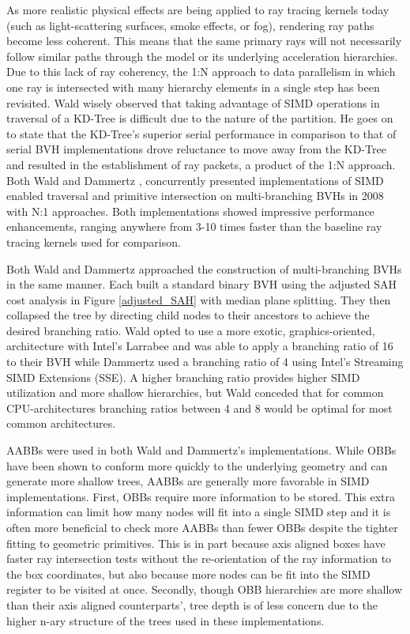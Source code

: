 As more realistic physical effects are being applied to ray tracing kernels
today (such as light-scattering surfaces, smoke effects, or fog), rendering ray
paths become less coherent. This means that the same primary rays will not
necessarily follow similar paths through the model or its underlying
acceleration hierarchies. Due to this lack of ray coherency, the 1:N approach to
data parallelism in which one ray is intersected with many hierarchy elements in
a single step has been revisited. Wald wisely observed that taking advantage of
SIMD operations in traversal of a KD-Tree is difficult due to the nature of the
partition. He goes on to state that the KD-Tree's superior serial performance in
comparison to that of serial BVH implementations drove reluctance to move away
from the KD-Tree and resulted in the establishment of ray packets, a product of
the 1:N approach. \cite{Wald_2008} Both Wald and Dammertz \cite{Dammertz_2008},
concurrently presented implementations of SIMD enabled traversal and primitive
intersection on multi-branching BVHs in 2008 with N:1 approaches. Both
implementations showed impressive performance enhancements, ranging anywhere
from 3-10 times faster than the baseline ray tracing kernels used for
comparison.

Both Wald and Dammertz approached the construction of multi-branching BVHs in
the same manner. Each built a standard binary BVH using the adjusted SAH cost
analysis in Figure \ref{adjusted_SAH} with median plane splitting. They then
collapsed the tree by directing child nodes to their ancestors to achieve the
desired branching ratio. Wald opted to use a more exotic, graphics-oriented,
architecture with Intel's Larrabee and was able to apply a branching ratio of 16
to their BVH while Dammertz used a branching ratio of 4 using Intel's Streaming
SIMD Extensions (SSE). A higher branching ratio provides higher SIMD utilization
and more shallow hierarchies, but Wald conceded that for common CPU-architectures
branching ratios between 4 and 8 would be optimal for most common architectures.

AABBs were used in both Wald and Dammertz's implementations. While OBBs have
been shown to conform more quickly to the underlying geometry and can generate
more shallow trees, AABBs are generally more favorable in SIMD
implementations. First, OBBs require more information to be stored. This extra
information can limit how many nodes will fit into a single SIMD step and it is
often more beneficial to check more AABBs than fewer OBBs despite the tighter
fitting to geometric primitives. This is in part because axis aligned boxes have
faster ray intersection tests without the re-orientation of the ray information
to the box coordinates, but also because more nodes can be fit into the SIMD
register to be visited at once. Secondly, though OBB hierarchies are more
shallow than their axis aligned counterparts', tree depth is of less concern due
to the higher n-ary structure of the trees used in these implementations.

